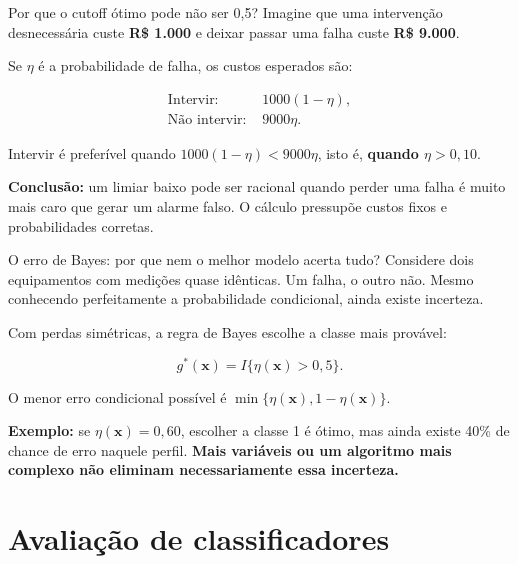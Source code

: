 \documentclass[
  10pt,
  ignorenonframetext,
  aspectratio=169,
  brazilian,
]{beamer}
\begin{document}
\begin{frame}{Por que o cutoff ótimo pode não ser 0,5?}
\protect{}\label{por-que-o-cutoff-uxf3timo-pode-nuxe3o-ser-05}
Imagine que uma intervenção desnecessária custe \textbf{R\$ 1.000} e
deixar passar uma falha custe \textbf{R\$ 9.000}.

Se \(\eta\) é a probabilidade de falha, os custos esperados são:

\[
\begin{aligned}
\text{Intervir: }&1000(1-\eta),\\
\text{Não intervir: }&9000\eta.
\end{aligned}
\]

Intervir é preferível quando \(1000(1-\eta)<9000\eta\), isto é,
\textbf{quando \(\eta>0{,}10\)}.

\textbf{Conclusão:} um limiar baixo pode ser racional quando perder uma
falha é muito mais caro que gerar um alarme falso. O cálculo pressupõe
custos fixos e probabilidades corretas.
\end{frame}

\begin{frame}{O erro de Bayes: por que nem o melhor modelo acerta tudo?}
\protect{}\label{o-erro-de-bayes-por-que-nem-o-melhor-modelo-acerta-tudo}
Considere dois equipamentos com medições quase idênticas. Um falha, o
outro não. Mesmo conhecendo perfeitamente a probabilidade condicional,
ainda existe incerteza.

Com perdas simétricas, a regra de Bayes escolhe a classe mais provável:

\[
g^*(\mathbf x)=I\{\eta(\mathbf x)>0{,}5\}.
\]

O menor erro condicional possível é
\(\min\{\eta(\mathbf x),1-\eta(\mathbf x)\}\).

\textbf{Exemplo:} se \(\eta(\mathbf x)=0{,}60\), escolher a classe 1 é
ótimo, mas ainda existe 40\% de chance de erro naquele perfil.
\textbf{Mais variáveis ou um algoritmo mais complexo não eliminam
necessariamente essa incerteza.}
\end{frame}

\section{Avaliação de
classificadores}\label{avaliauxe7uxe3o-de-classificadores}
\end{document}
